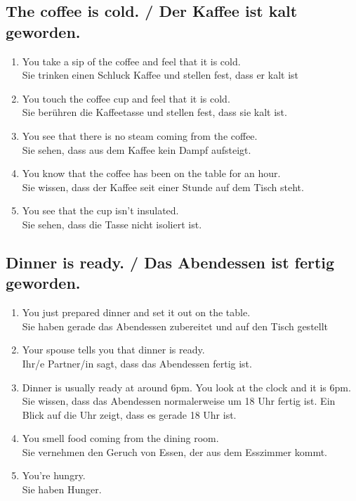 \documentclass[11pt]{article}
\begin{document}
\subsection{The coffee is cold. / Der Kaffee ist kalt geworden.}

\begin{enumerate} 
	\item You take a sip of the coffee and feel that it is cold. \\
	Sie trinken einen Schluck Kaffee und stellen fest, dass er kalt ist
	\item You touch the coffee cup and feel that it is cold.\\
	Sie berühren die Kaffeetasse und stellen fest, dass sie kalt ist.
	\item You see that there is no steam coming from the coffee.\\
	Sie sehen, dass aus dem Kaffee kein Dampf aufsteigt.
	\item You know that the coffee has been on the table for an hour.\\
	Sie wissen, dass der Kaffee seit einer Stunde auf dem Tisch steht.
	\item You see that the cup isn't insulated.\\
	Sie sehen, dass die Tasse nicht isoliert ist.
\end{enumerate}

\subsection{Dinner is ready. / Das Abendessen ist fertig geworden.}

\begin{enumerate}
	\item You just prepared dinner and set it out on the table.\\
	Sie haben gerade das Abendessen zubereitet und auf den Tisch gestellt
	\item Your spouse tells you that dinner is ready.\\
	Ihr/e Partner/in sagt, dass das Abendessen fertig ist.
	\item Dinner is usually ready at around 6pm. You look at the clock and it is 6pm.\\
	Sie wissen, dass das Abendessen normalerweise um 18 Uhr fertig ist. Ein Blick auf die Uhr zeigt, dass es gerade 18 Uhr ist.
	\item You smell food coming from the dining room.\\
	Sie vernehmen den Geruch von Essen, der aus dem Esszimmer kommt.
	\item You're hungry.\\
	Sie haben Hunger.
\end{enumerate}
\end{document}
